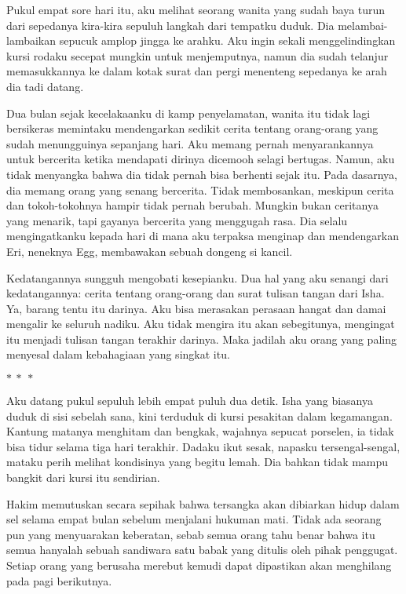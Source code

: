 \documentclass[smalldemyvopaper,11pt,twoside,onecolumn,openright,extrafontsizes]{memoir}
\newcommand\separator{
  \begin{center}
    \(\ast~\ast~\ast\)
  \end{center}
}
\begin{document}

Pukul empat sore hari itu, aku melihat seorang wanita yang sudah baya turun dari sepedanya kira-kira sepuluh langkah dari tempatku duduk. Dia melambai-lambaikan sepucuk amplop jingga ke arahku. Aku ingin sekali menggelindingkan kursi rodaku secepat mungkin untuk menjemputnya, namun dia sudah telanjur memasukkannya ke dalam kotak surat dan pergi menenteng sepedanya ke arah dia tadi datang.


Dua bulan sejak kecelakaanku di kamp penyelamatan, wanita itu tidak lagi bersikeras memintaku mendengarkan sedikit cerita tentang orang-orang yang sudah menungguinya sepanjang hari. Aku memang pernah menyarankannya untuk bercerita ketika mendapati dirinya dicemooh selagi bertugas. Namun, aku tidak menyangka bahwa dia tidak pernah bisa berhenti sejak itu. Pada dasarnya, dia memang orang yang senang bercerita. Tidak membosankan, meskipun cerita dan tokoh-tokohnya hampir tidak pernah berubah. Mungkin bukan ceritanya yang menarik, tapi gayanya bercerita yang menggugah rasa. Dia selalu mengingatkanku kepada hari di mana aku terpaksa menginap dan mendengarkan Eri, neneknya Egg, membawakan sebuah dongeng si kancil.


Kedatangannya sungguh mengobati kesepianku. Dua hal yang aku senangi dari kedatangannya: cerita tentang orang-orang dan surat tulisan tangan dari Isha. Ya, barang tentu itu darinya. Aku bisa merasakan perasaan hangat dan damai mengalir ke seluruh nadiku. Aku tidak mengira itu akan sebegitunya, mengingat itu menjadi tulisan tangan terakhir darinya. Maka jadilah aku orang yang paling menyesal dalam kebahagiaan yang singkat itu.

\separator{}


Aku datang pukul sepuluh lebih empat puluh dua detik. Isha yang biasanya duduk di sisi sebelah sana, kini terduduk di kursi pesakitan dalam kegamangan. Kantung matanya menghitam dan bengkak, wajahnya sepucat porselen, ia tidak bisa tidur selama tiga hari terakhir. Dadaku ikut sesak, napasku tersengal-sengal, mataku perih melihat kondisinya yang begitu lemah. Dia bahkan tidak mampu bangkit dari kursi itu sendirian.

Hakim memutuskan secara sepihak bahwa tersangka akan dibiarkan hidup dalam sel selama empat bulan sebelum menjalani hukuman mati. Tidak ada seorang pun yang menyuarakan keberatan, sebab semua orang tahu benar bahwa itu semua hanyalah sebuah sandiwara satu babak yang ditulis oleh pihak penggugat. Setiap orang yang berusaha merebut kemudi dapat dipastikan akan menghilang pada pagi berikutnya.
\end{document}
